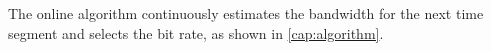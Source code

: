 


  
The online algorithm continuously estimates the bandwidth for the next time segment and selects the bit rate, as shown in \autoref{cap:algorithm}. 
